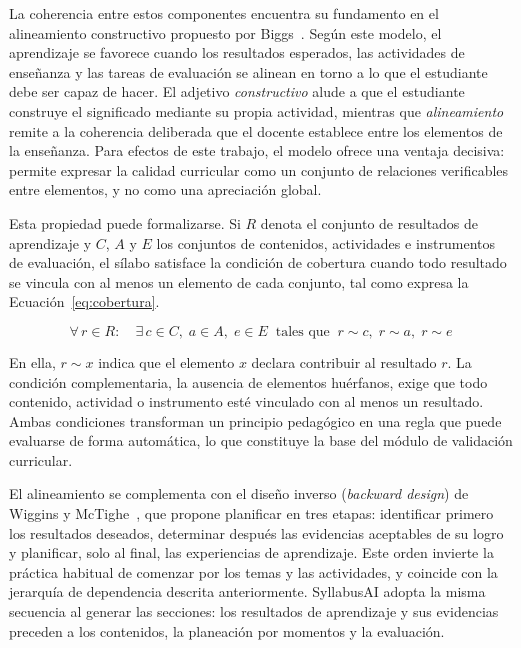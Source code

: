 La coherencia entre estos componentes encuentra su fundamento en el alineamiento constructivo propuesto por Biggs~\cite{biggs1996alignment}. Según este modelo, el aprendizaje se favorece cuando los resultados esperados, las actividades de enseñanza y las tareas de evaluación se alinean en torno a lo que el estudiante debe ser capaz de hacer. El adjetivo \textit{constructivo} alude a que el estudiante construye el significado mediante su propia actividad, mientras que \textit{alineamiento} remite a la coherencia deliberada que el docente establece entre los elementos de la enseñanza. Para efectos de este trabajo, el modelo ofrece una ventaja decisiva: permite expresar la calidad curricular como un conjunto de relaciones verificables entre elementos, y no como una apreciación global.

Esta propiedad puede formalizarse. Si $R$ denota el conjunto de resultados de aprendizaje y $C$, $A$ y $E$ los conjuntos de contenidos, actividades e instrumentos de evaluación, el sílabo satisface la condición de cobertura cuando todo resultado se vincula con al menos un elemento de cada conjunto, tal como expresa la Ecuación~\ref{eq:cobertura}.

\begin{equation}
\label{eq:cobertura}
\forall\, r \in R:\quad \exists\, c \in C,\; a \in A,\; e \in E \;\; \text{tales que} \;\; r \sim c,\; r \sim a,\; r \sim e
\end{equation}

En ella, $r \sim x$ indica que el elemento $x$ declara contribuir al resultado $r$. La condición complementaria, la ausencia de elementos huérfanos, exige que todo contenido, actividad o instrumento esté vinculado con al menos un resultado. Ambas condiciones transforman un principio pedagógico en una regla que puede evaluarse de forma automática, lo que constituye la base del módulo de validación curricular.

El alineamiento se complementa con el diseño inverso (\textit{backward design}) de Wiggins y McTighe~\cite{wiggins2005ubd}, que propone planificar en tres etapas: identificar primero los resultados deseados, determinar después las evidencias aceptables de su logro y planificar, solo al final, las experiencias de aprendizaje. Este orden invierte la práctica habitual de comenzar por los temas y las actividades, y coincide con la jerarquía de dependencia descrita anteriormente. SyllabusAI adopta la misma secuencia al generar las secciones: los resultados de aprendizaje y sus evidencias preceden a los contenidos, la planeación por momentos y la evaluación.

